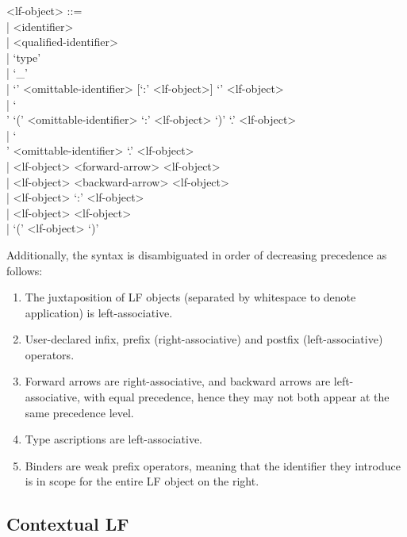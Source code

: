 \documentclass[11pt]{article}
\newcommand{\LF}{\textsc{LF}\xspace}
\begin{document}
\begin{grammar}
<lf-object> ::= \hfill\\
| <identifier>\\
| <qualified-identifier>\\
| `type'\\
| `_'\\
| `{' <omittable-identifier> [`:' <lf-object>] `}' <lf-object>\\
| `\\' `(' <omittable-identifier> `:' <lf-object> `)' `.' <lf-object>\\
| `\\' <omittable-identifier> `.' <lf-object>\\
| <lf-object> <forward-arrow> <lf-object>\\
| <lf-object> <backward-arrow> <lf-object>\\
| <lf-object> `:' <lf-object>\\
| <lf-object> <lf-object>\\
| `(' <lf-object> `)'
\end{grammar}

Additionally, the syntax is disambiguated in order of decreasing precedence as follows:

\begin{enumerate}
\item The juxtaposition of \LF objects (separated by whitespace to denote application) is left-associative.
\item User-declared infix, prefix (right-associative) and postfix (left-associative) operators.
\item Forward arrows are right-associative, and backward arrows are left-associative, with equal precedence, hence they may not both appear at the same precedence level.
\item Type ascriptions are left-associative.
\item Binders are weak prefix operators, meaning that the identifier they introduce is in scope for the entire \LF object on the right.
\end{enumerate}

\subsection{Contextual LF}
\end{document}
